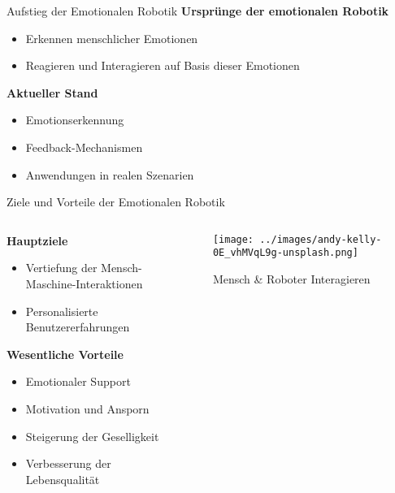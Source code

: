 \documentclass[aspectratio=169]{beamer}
\begin{document}
\begin{frame}{Aufstieg der Emotionalen Robotik}
  \textbf{Ursprünge der emotionalen Robotik}
  \begin{itemize}
    \item Erkennen menschlicher Emotionen
    \item Reagieren und Interagieren auf Basis dieser Emotionen
  \end{itemize}
  \vspace*{.5cm}

  \textbf{Aktueller Stand}
  \begin{itemize}
    \item Emotionserkennung
    \item Feedback-Mechanismen
    \item Anwendungen in realen Szenarien
  \end{itemize}
\end{frame}

\begin{frame}{Ziele und Vorteile der Emotionalen Robotik}
  \begin{columns}
    \begin{column}{0.6\textwidth}
      \textbf{Hauptziele}
      \begin{itemize}
        \item Vertiefung der Mensch-Maschine-Interaktionen
        \item Personalisierte Benutzererfahrungen
      \end{itemize}
      \vspace*{.5cm}

      \textbf{Wesentliche Vorteile}
      \begin{itemize}
        \item Emotionaler Support
        \item Motivation und Ansporn
        \item Steigerung der Geselligkeit
        \item Verbesserung der Lebensqualität
      \end{itemize}
    \end{column}
    \begin{column}{0.4\textwidth}
      \begin{figure}[h]
        \centering
        \texttt{[image: ../images/andy-kelly-0E\_vhMVqL9g-unsplash.png]}
        \caption{Mensch \& Roboter Interagieren}
      \end{figure}
    \end{column}
  \end{columns}
\end{frame}
\end{document}
